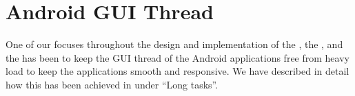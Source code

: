 
\section{Android GUI Thread}
\label{sec:gui_thread_async_task}

One of our focuses throughout the design and implementation of the \launcher, the \ct, and the \gc has been to keep the GUI thread of the Android applications free from heavy load to keep the applications smooth and responsive. We have described in detail how this has been achieved in  under ``Long tasks''.

 

